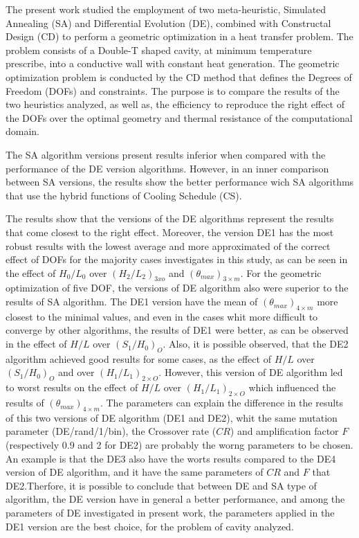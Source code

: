 \documentclass[12pt,fleqn]{article}
\begin{document}
The present work studied the employment of two meta-heuristic, Simulated Annealing (SA) and Differential Evolution (DE), combined with Constructal Design (CD) to perform a geometric optimization in a heat transfer problem. The problem consists of a Double-T shaped cavity, at minimum temperature prescribe, into a conductive wall with constant heat generation. The geometric optimization problem is conducted by the CD method that defines the Degrees of Freedom (DOFs) and constraints. The purpose is to compare the results of the two heuristics analyzed, as well as, the efficiency to reproduce the right effect of the DOFs over the optimal geometry and thermal resistance of the computational domain.

The SA algorithm versions present results inferior when compared with the performance of the DE version algorithms. However, in an inner comparison between SA versions,  the results show the better performance wich SA algorithms that use the hybrid functions of Cooling Schedule (CS).

The results show that the versions of the DE algorithms represent the results that come closest to the right effect. Moreover, the version DE1 has the most robust results with the lowest average and more approximated of the correct effect of DOFs for the majority cases investigates in this study, as can be seen in the effect of $H_{0}/L_{0}$ over $(H_{2}/L_{2})_{3xo}$ and $({\theta}_{max})_{3\times m}$. For the geometric optimization of five DOF, the versions of DE algorithm also were superior to the results of SA algorithm. The DE1 version have the mean of $({\theta}_{max})_{4\times m}$ more closest to the minimal values, and even in the cases whit more difficult to converge by other algorithms, the results of DE1 were better, as can be observed in the effect of  $H/L$ over ${(S_{1}/H_{0})_{O}}$. Also, it is possible observed, that the DE2 algorithm achieved good results for some cases, as the effect of $H/L$ over ${(S_{1}/H_{0})_{O}}$ and over ${(H_{1}/L_{1})_{2  \times O}}$. However, this version of DE algorithm led to worst results on the effect of $H/L$ over ${(H_{1}/L_{1})_{2  \times O}}$ which influenced the results of $({\theta}_{max})_{4\times m}$. The parameters can explain the difference in the results of this two versions of DE algorithm (DE1 and DE2), whit the same mutation parameter (DE/rand/1/bin), the Crossover rate ($CR$) and amplification factor $F$ (respectively 0.9 and 2 for DE2) are probably the worng parameters to be chosen. An example is that the DE3 also have the worts results compared to the DE4 version of DE algorithm, and it have the same parameters of $CR$ and $F$ that DE2.Therfore, it is possible to conclude that between DE and SA type of algorithm, the DE version have in general a better performance, and among the parameters of DE investigated in present work, the parameters applied in the DE1 version are the best choice, for the problem of cavity analyzed.
\end{document}
